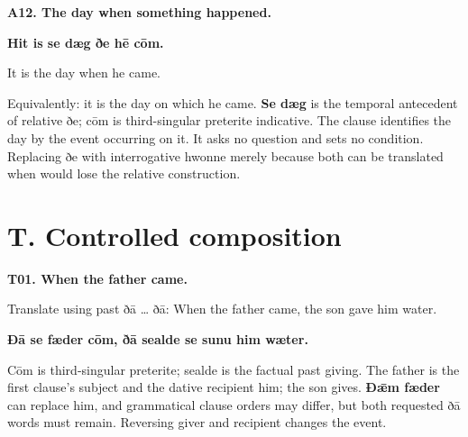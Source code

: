 \par\begin{minipage}{\linewidth}\raggedright
\textbf{A12. The day when something happened.}

\textbf{Hit is se dæg ðe hē cōm.}

It is the day when he came.

Equivalently: it is the day on which he came. \textbf{Se dæg} is the temporal antecedent of relative ðe; cōm is third-singular preterite indicative. The clause identifies the day by the event occurring on it. It asks no question and sets no condition. Replacing ðe with interrogative hwonne merely because both can be translated when would lose the relative construction.

\end{minipage}\par\addvspace{4pt}

\section*{T. Controlled composition}

\par\begin{minipage}{\linewidth}\raggedright
\textbf{T01. When the father came.}

Translate using past ðā … ðā: When the father came, the son gave him water.

\textbf{Ðā se fæder cōm, ðā sealde se sunu him wæter.}

Cōm is third-singular preterite; sealde is the factual past giving. The father is the first clause's subject and the dative recipient him; the son gives. \textbf{Ðǣm fæder} can replace him, and grammatical clause orders may differ, but both requested ðā words must remain. Reversing giver and recipient changes the event.

\end{minipage}\par\addvspace{4pt}

